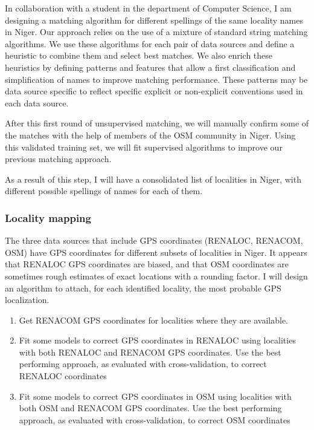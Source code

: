 In collaboration with a student in the department of Computer Science, I am designing a matching algorithm for different spellings of the same locality names in Niger. Our approach relies on the use of  a mixture of standard string matching algorithms. We use these algorithms for each pair of data sources and define a heuristic to combine them and select best matches. We also enrich these heuristics by defining patterns and features that allow a first classification and simplification of names to improve matching performance. These patterns may be data source specific to reflect specific explicit or non-explicit conventions used in each data source.

After this first round of unsupervised matching, we will manually confirm some of the matches with the help of members of the OSM community in Niger. Using this validated training set, we will fit supervised algorithms to improve our previous matching approach.

As a result of this step, I will have a consolidated list of localities in Niger, with different possible spellings of names for each of them.

\subsubsection{Locality mapping}

The three data sources that include GPS coordinates (RENALOC, RENACOM, OSM) have GPS coordinates for different subsets of localities in Niger. It appears that RENALOC GPS coordinates are biased, and that OSM coordinates are sometimes rough estimates of exact locations with a rounding factor. I will design an algorithm to attach, for each identified locality, the most probable GPS localization.

\begin{enumerate}
\item Get RENACOM GPS coordinates for localities where they are available.
\item Fit some models to correct GPS coordinates in RENALOC using localities with both RENALOC and RENACOM GPS coordinates. Use the best performing approach, as evaluated with cross-validation, to correct RENALOC coordinates
\item Fit some models to correct GPS coordinates in OSM using localities with both OSM and RENACOM GPS coordinates. Use the best performing approach, as evaluated with cross-validation, to correct OSM coordinates
\end{enumerate}


